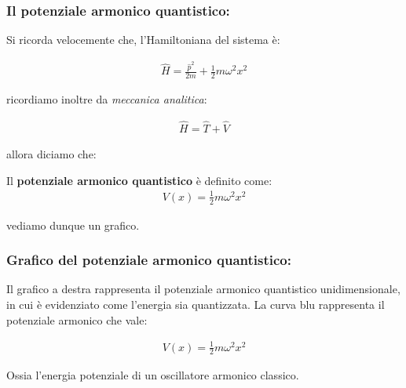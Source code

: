 \subsubsection{Il potenziale armonico quantistico:}

	Si ricorda velocemente che, l'Hamiltoniana del sistema è:
	
\begin{align*}
	\hat{H} = \frac{\hat{p}^2}{2m} + \frac{1}{2}m\omega^2x^2
\end{align*}

	ricordiamo inoltre da \textit{meccanica analitica}:
	
\begin{align*}
	\hat{H} = \hat{T} + \hat{V}
\end{align*}

	allora diciamo che:
	
\begin{mydef}
	Il \textbf{potenziale armonico quantistico} è definito come:
\begin{align*}
	V(x) = \frac{1}{2}m\omega^2x^2
\end{align*}
\end{mydef}
	
	vediamo dunque un grafico. 
	
\subsubsection{Grafico del potenziale armonico quantistico:}

\vspace{1em}
\begin{minipage}{0.45\textwidth}
	 Il grafico a destra rappresenta il potenziale armonico quantistico unidimensionale, in cui è evidenziato come l'energia sia quantizzata. La curva blu rappresenta il potenziale armonico che vale:
	 
\begin{align*}
	V(x) = \frac{1}{2} m\omega^2x^2
\end{align*}

	Ossia l'energia potenziale di un oscillatore armonico classico. 
	
 \end{minipage}
\hfill
\begin{minipage}{0.4\textwidth}

\end{minipage}
\vspace{1em}

